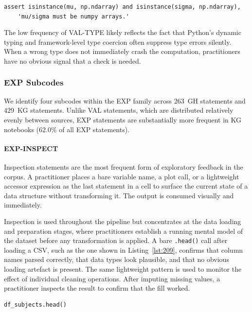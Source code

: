 \begin{lstlisting}[caption={}, label={lst:232}]
assert isinstance(mu, np.ndarray) and isinstance(sigma, np.ndarray),
    'mu/sigma must be numpy arrays.'
\end{lstlisting}

The low frequency of VAL-TYPE likely reflects the fact
that Python's dynamic typing and framework-level type coercion
often suppress type errors silently.
When a wrong type does not immediately crash the computation,
practitioners have no obvious signal that a check is needed.

\subsubsection{EXP Subcodes}
\label{sec:exp-subcodes}

We identify four subcodes within the EXP family
across 263~GH statements and 429~KG statements.
Unlike VAL statements, which are distributed relatively evenly between sources,
EXP statements are substantially more frequent in KG notebooks (62.0\% of all EXP statements).

\paragraph{EXP-INSPECT}

Inspection statements are the most frequent form of exploratory feedback in the corpus.
A practitioner places a bare variable name,
a plot call,
or a lightweight accessor expression as the last statement in a cell
to surface the current state of a data structure
without transforming it.
The output is consumed visually and immediately.

Inspection is used throughout the pipeline
but concentrates at the data loading and preparation stages,
where practitioners establish a running mental model of the dataset
before any transformation is applied.
A bare \lstinline{.head()} call after loading a CSV,
such as the one shown in Listing~\ref{lst:209},
confirms that column names parsed correctly,
that data types look plausible,
and that no obvious loading artefact is present.
The same lightweight pattern is used to monitor the effect of individual cleaning operations.
After imputing missing values,
a practitioner inspects the result to confirm that the fill worked.

\begin{lstlisting}[caption={}, label={lst:209}]
df_subjects.head()
\end{lstlisting}

